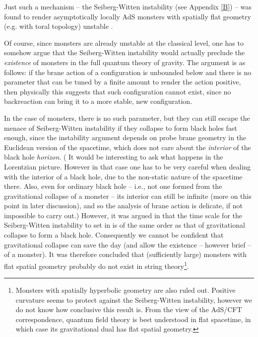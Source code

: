 \documentclass[12pt]{article}
\newcommand{\2}{$^2$}
\newcommand{\3}{$^3$}
\newcommand{\4}{$_4$}
\newcommand{\5}{$_5$}
\begin{document}

Just such a mechanism -- the Seiberg-Witten instability (see Appendix \ref{B}) -- was found to render asymptotically locally AdS monsters with spatially flat geometry (e.g. with toral topology) unstable \cite{ycmonster}. 




Of course, since monsters are already unstable at the classical level, one has to somehow argue that the Seiberg-Witten instability would actually preclude the \emph{existence} of monsters in the full quantum theory of gravity. The argument is as follows: if the brane action of a configuration is unbounded below and there is no parameter that can be tuned by a finite amount to render the action positive, then physically this suggests that such configuration cannot exist, since no backreaction can bring it to a more stable, new configuration.

In the case of monsters, there is no such parameter, but they can still escape the menace of Seiberg-Witten instability if they collapse to form black holes fast enough, since the instability argument depends on probe brane geometry in the Euclidean version of the spacetime, which does not care about the \emph{interior} of the black hole \emph{horizon}. ({\color{black} It would be interesting to ask what happens in the Lorentzian picture. However in that case one has to be very careful when dealing with the interior of a black hole, due to the non-static nature of the spacetime there. Also, even for ordinary black hole -- i.e., not one formed from the gravitational collapse of a monster -- its interior can still be infinite (more on this point in later discussion), and so the analysis of brane action is delicate, if not impossible to carry out.}) However, it was argued in \cite{ycmonster} that the time scale for the Seiberg-Witten instability to set in is of the same order as that of gravitational collapse to form a black hole. Consequently we cannot be confident that gravitational collapse can save the day (and allow the existence -- however brief -- of a monster). It was therefore concluded that (sufficiently large) monsters with flat spatial geometry probably do not exist in string theory\footnote{Monsters with spatially hyperbolic geometry are also ruled out. Positive curvature seems to protect against the Seiberg-Witten instability, however we do not know how conclusive this result is. From the view of the AdS/CFT correspondence, quantum field theory is best understood in flat spacetime, in which case its gravitational dual has flat spatial geometry.}. 
\end{document}

